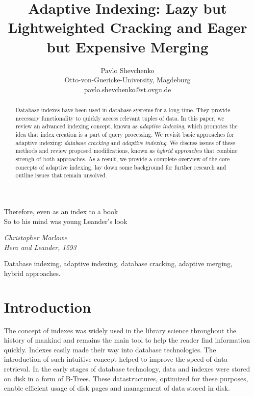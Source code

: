 \documentclass[10pt, conference, compsocconf]{IEEEtran}
\begin{document}
\title{Adaptive Indexing: Lazy but Lightweighted Cracking and Eager but Expensive Merging}
\author{Pavlo Shevchenko \\ Otto-von-Guericke-University, Magdeburg \\ pavlo.shevchenko@st.ovgu.de}

\maketitle

\epigraph{Therefore, even as an index to a book \\
So to his mind was young Leander's look}{\textit{Christopher Marlowe\\Hero and Leander, 1593}}

\begin{abstract}
Database indexes have been used in database systems for a long time. They provide necessary functionality to quickly access relevant tuples of data. In this paper, we review an advanced indexing concept, known as \emph{adaptive indexing}, which promotes the idea that index creation is a part of query processing. We revisit basic approaches for adaptive indexing: \emph{database cracking} and \emph{adaptive indexing}. We discuss issues of these methods and review proposed modifications, known as \emph{hybrid approaches} that combine strengh of both approaches. As a result, we provide a complete overview of the core concepts of adaptive indexing, lay down some background for further research and outline issues that remain unsolved.\\
\end{abstract}

\begin{IEEEkeywords}
Database indexing, adaptive indexing, database cracking, adaptive merging, hybrid approaches.
\end{IEEEkeywords}

\section{Introduction}
The concept of indexes was widely used in the library science throughout the history of mankind and remains the main tool to help the reader find information quickly. Indexes easily made their way into database technologies. The introduction of such intuitive concept helped to improve the speed of data retrieval. In the early stages of database technology, data and indexes were stored on disk in a form of B-Trees. These datastructures, optimized for these purposes, enable efficient usage of disk pages and management of data stored in disk.
\end{document}
